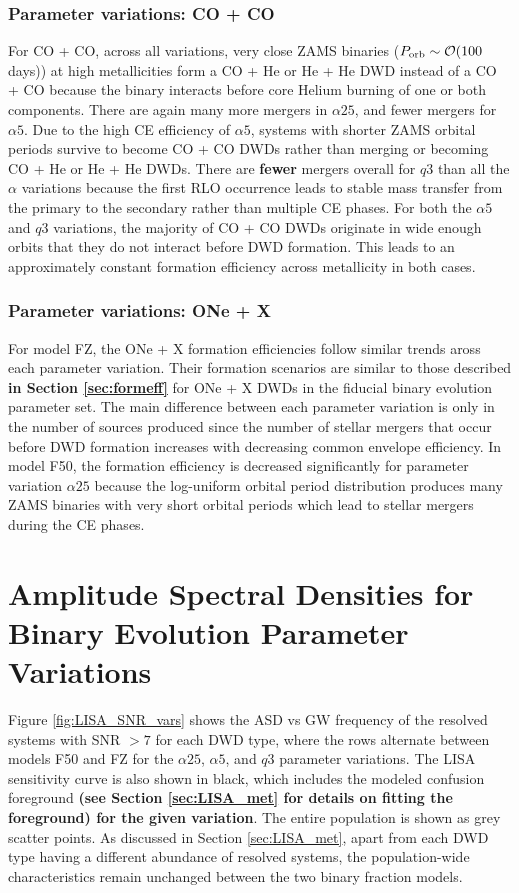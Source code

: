 \documentclass[twocolumn, linenumbers]{aastex631}
\begin{document}
\subsubsection{\textbf{Parameter variations: CO + CO}}\label{formeff_CO_vars}
For CO + CO, across all variations, very close ZAMS binaries ($P_{\rm{orb}}\sim\mathcal{O}(100$ days)) at high metallicities form a CO + He or He + He DWD instead of a CO + CO because the binary interacts before core Helium burning of one or both components. There are again many more mergers in $\alpha25$, and fewer mergers for $\alpha5$. Due to the high CE efficiency of $\alpha5$, systems with shorter ZAMS orbital periods survive to become CO + CO DWDs rather than merging or becoming CO + He or He + He DWDs. There are \textbf{fewer} mergers overall for $q3$ than all the $\alpha$ variations because the first RLO occurrence leads to stable mass transfer from the primary to the secondary rather than multiple CE phases. For both the $\alpha5$ and $q3$ variations, the majority of CO + CO DWDs originate in wide enough orbits that they do not interact before DWD formation. This leads to an approximately constant formation efficiency across metallicity in both cases.

\subsubsection{\textbf{Parameter variations: ONe + X}}\label{formeff_ONe_vars}
For model FZ, the ONe + X formation efficiencies follow similar trends aross each parameter variation. Their formation scenarios are similar to those described \textbf{in Section \ref{sec:formeff}} for ONe + X DWDs in the fiducial binary evolution parameter set. The main difference between each parameter variation is only in the number of sources produced since the number of stellar mergers that occur before DWD formation increases with decreasing common envelope efficiency. In model F50, the formation efficiency is decreased significantly for parameter variation $\alpha25$ because the log-uniform orbital period distribution produces many ZAMS binaries with very short orbital periods which lead to stellar mergers during the CE phases.


\section{Amplitude Spectral Densities for Binary Evolution Parameter Variations}\label{appendix:ASD_vars}

Figure \ref{fig:LISA_SNR_vars} shows the ASD vs GW frequency of the resolved systems with SNR $> 7$ for each DWD type, where the rows alternate between models F50 and FZ for the $\alpha25$, $\alpha5$, and $q3$ parameter variations. The LISA sensitivity curve is also shown in black, which includes the modeled confusion foreground \textbf{(see Section \ref{sec:LISA_met} for details on fitting the foreground) for the given variation}. The entire population is shown as grey scatter points. As discussed in Section \ref{sec:LISA_met}, apart from each DWD type having a different abundance of resolved systems, the population-wide characteristics remain unchanged between the two binary fraction models.
\end{document}
